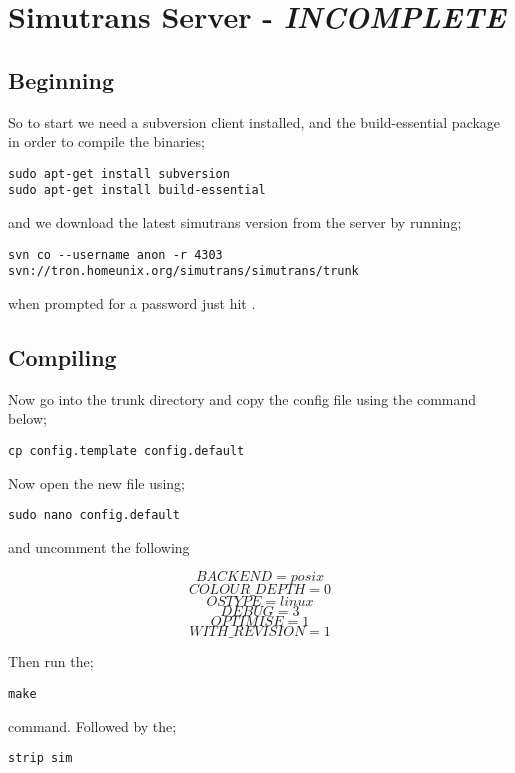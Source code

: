 \chapter{Simutrans Server - \textit{INCOMPLETE}}

\section{Beginning}

So to start we need a subversion client installed, and the build-essential package in order to compile the binaries;

\begin{lstlisting}
sudo apt-get install subversion
sudo apt-get install build-essential
\end{lstlisting}

and we download the latest simutrans version from the server by running;

\begin{lstlisting}
svn co --username anon -r 4303 svn://tron.homeunix.org/simutrans/simutrans/trunk
\end{lstlisting}

when prompted for a password just hit \keys{\enter}.

\section{Compiling}

Now go into the trunk directory and copy the config file using the command below;

\begin{lstlisting}
cp config.template config.default
\end{lstlisting}

Now open the new file using;

\begin{lstlisting}
sudo nano config.default
\end{lstlisting}

and uncomment the following

$$
BACKEND = posix
$$$$
COLOUR\_DEPTH = 0
$$$$
OSTYPE = linux
$$$$
DEBUG = 3
$$$$
OPTIMISE = 1
$$$$
WITH\_REVISION = 1
$$

Then run the;

\begin{lstlisting}
make
\end{lstlisting}

command. Followed by the;

\begin{lstlisting}
strip sim
\end{lstlisting}